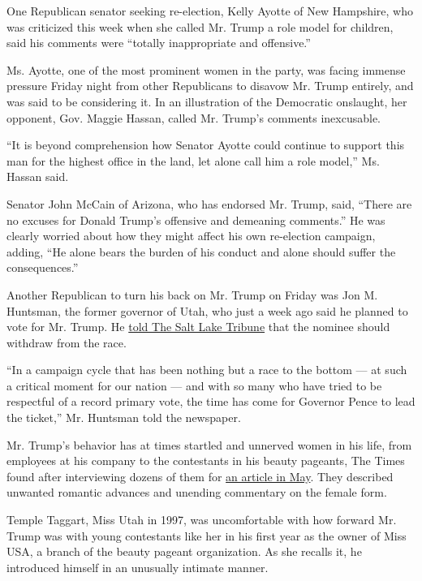 One Republican senator seeking re-election, Kelly Ayotte of New
Hampshire, who was criticized this week when she called Mr. Trump a role
model for children, said his comments were ``totally inappropriate and
offensive.''

Ms. Ayotte, one of the most prominent women in the party, was facing
immense pressure Friday night from other Republicans to disavow Mr.
Trump entirely, and was said to be considering it. In an illustration of
the Democratic onslaught, her opponent, Gov. Maggie Hassan, called Mr.
Trump's comments inexcusable.

``It is beyond comprehension how Senator Ayotte could continue to
support this man for the highest office in the land, let alone call him
a role model,'' Ms. Hassan said.

Senator John McCain of Arizona, who has endorsed Mr. Trump, said,
``There are no excuses for Donald Trump's offensive and demeaning
comments.'' He was clearly worried about how they might affect his own
re-election campaign, adding, ``He alone bears the burden of his conduct
and alone should suffer the consequences.''

Another Republican to turn his back on Mr. Trump on Friday was Jon M.
Huntsman, the former governor of Utah, who just a week ago said he
planned to vote for Mr. Trump. He
\href{http://www.sltrib.com/news/4444721-155/after-video-huntsman-says-it-is}{told
The Salt Lake Tribune} that the nominee should withdraw from the race.

``In a campaign cycle that has been nothing but a race to the bottom ---
at such a critical moment for our nation --- and with so many who have
tried to be respectful of a record primary vote, the time has come for
Governor Pence to lead the ticket,'' Mr. Huntsman told the newspaper.

Mr. Trump's behavior has at times startled and unnerved women in his
life, from employees at his company to the contestants in his beauty
pageants, The Times found after interviewing dozens of them for
\href{http://www.nytimes.com/2016/05/15/us/politics/donald-trump-women.html}{an
article in May}. They described unwanted romantic advances and unending
commentary on the female form.

Temple Taggart, Miss Utah in 1997, was uncomfortable with how forward
Mr. Trump was with young contestants like her in his first year as the
owner of Miss USA, a branch of the beauty pageant organization. As she
recalls it, he introduced himself in an unusually intimate manner.

